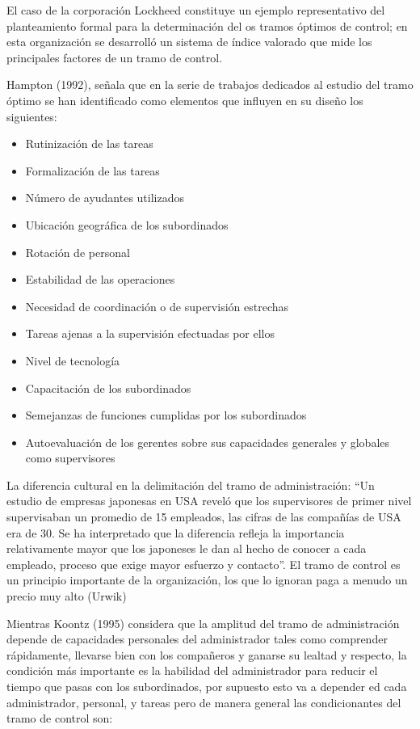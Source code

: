 El caso de la corporación Lockheed constituye un ejemplo representativo del planteamiento formal para la determinación del os tramos óptimos de control; en esta organización se desarrolló un sistema de índice valorado que mide los principales factores de un tramo de control.

Hampton (1992), señala que en la serie de trabajos dedicados al estudio del tramo óptimo se han identificado como elementos que influyen en su diseño los siguientes:
\begin{itemize}
    \item Rutinización de las tareas
    \item Formalización de las tareas
    \item Número de ayudantes utilizados
    \item Ubicación geográfica de los subordinados
    \item Rotación de personal
    \item Estabilidad de las operaciones
    \item Necesidad de coordinación o de supervisión estrechas
    \item Tareas ajenas a la supervisión efectuadas por ellos
    \item Nivel de tecnología
    \item Capacitación de los subordinados
    \item Semejanzas de funciones cumplidas por los subordinados
    \item Autoevaluación de los gerentes sobre sus capacidades generales y globales como supervisores
\end{itemize}
La diferencia cultural en la delimitación del tramo de administración: ``Un estudio de empresas japonesas en USA reveló que los supervisores de primer nivel supervisaban un promedio de 15 empleados, las cifras de las compañías de USA era de 30. Se ha interpretado que la diferencia refleja la importancia relativamente mayor que los japoneses le dan al hecho de conocer a cada empleado, proceso que exige mayor esfuerzo y contacto''. El tramo de control es un principio importante de la organización, los que lo ignoran paga a menudo un precio muy alto (Urwik)

Mientras Koontz (1995) considera que la amplitud del tramo de administración depende de capacidades personales del administrador tales como comprender rápidamente, llevarse bien con los compañeros y ganarse su lealtad y respecto, la condición más importante es la habilidad del administrador para reducir el tiempo que pasas con los subordinados, por supuesto esto va a depender ed cada administrador, personal, y tareas pero de manera general las condicionantes del tramo de control son:

